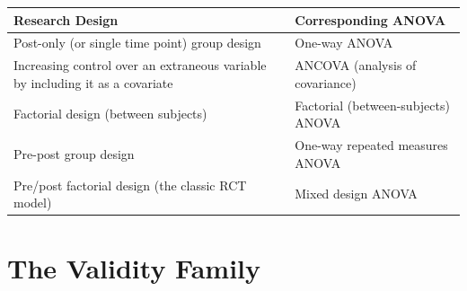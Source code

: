 \documentclass[
  english,
]{book}
\begin{document}
\begin{longtable}[]{@{}ll@{}}
\toprule
\begin{minipage}[b]{0.43\columnwidth}\raggedright
Research Design\strut
\end{minipage} & \begin{minipage}[b]{0.51\columnwidth}\raggedright
Corresponding ANOVA\strut
\end{minipage}\tabularnewline
\midrule
\endhead
\begin{minipage}[t]{0.43\columnwidth}\raggedright
Post-only (or single time point) group design\strut
\end{minipage} & \begin{minipage}[t]{0.51\columnwidth}\raggedright
One-way ANOVA\strut
\end{minipage}\tabularnewline
\begin{minipage}[t]{0.43\columnwidth}\raggedright
Increasing control over an extraneous variable by including it as a covariate\strut
\end{minipage} & \begin{minipage}[t]{0.51\columnwidth}\raggedright
ANCOVA (analysis of covariance)\strut
\end{minipage}\tabularnewline
\begin{minipage}[t]{0.43\columnwidth}\raggedright
Factorial design (between subjects)\strut
\end{minipage} & \begin{minipage}[t]{0.51\columnwidth}\raggedright
Factorial (between-subjects) ANOVA\strut
\end{minipage}\tabularnewline
\begin{minipage}[t]{0.43\columnwidth}\raggedright
Pre-post group design\strut
\end{minipage} & \begin{minipage}[t]{0.51\columnwidth}\raggedright
One-way repeated measures ANOVA\strut
\end{minipage}\tabularnewline
\begin{minipage}[t]{0.43\columnwidth}\raggedright
Pre/post factorial design (the classic RCT model)\strut
\end{minipage} & \begin{minipage}[t]{0.51\columnwidth}\raggedright
Mixed design ANOVA\strut
\end{minipage}\tabularnewline
\bottomrule
\end{longtable}

\hypertarget{the-validity-family}{%
\section{The Validity Family}\label{the-validity-family}}
\end{document}
